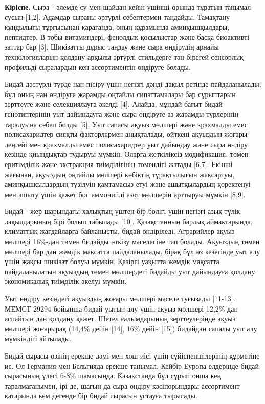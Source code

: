 \begin{multicols}{2}
{\bfseries Кіріспе.} Сыра - әлемде су мен шайдан кейін үшінші орында
тұратын танымал сусын {[}1,2{]}. Адамдар сыраны әртүрлі себептермен
таңдайды. Тамақтану құндылығы тұрғысынан қарағанда, оның құрамында
аминқышқылдары, пептидтер, В тобы витаминдері, фенолдық қосылыстар және
басқа биоактивті заттар бар {[}3{]}. Шикізатты дұрыс таңдау және сыра
өндірудің арнайы технологияларын қолдану арқылы әртүрлі стильдерге тән
бірегей сенсорлық профильді сыралардың кең ассортиментін өндіруге
болады.

Бидай дәстүрлі түрде нан пісіру үшін негізгі дәнді дақыл ретінде
пайдаланылады, бұл оның нан өндіруге жарамды оңтайлы сипаттамалары бар
сұрыптарын зерттеуге және селекциялауға әкелді {[}4{]}. Алайда, мұндай
бағыт бидай генотиптерінің уыт дайындауға және сыра өндіруге аз жарамды
түрлерінің таралуына себеп болды {[}5{]}. Уыт сапасы ақуыз мөлшері және
крахмалды емес полисахаридтер сияқты факторлармен анықталады, өйткені
ақуыздың жоғары деңгейі мен крахмалды емес полисахаридтер уыт дайындау
және сыра өндіру кезінде қиындықтар тудыруы мүмкін. Оларға жеткіліксіз
модификация, төмен еритімділік және экстракция тиімділігінің төмендігі
жатады {[}6,7{]}. Екінші жағынан, ақуыздың оңтайлы мөлшері көбіктің
тұрақтылығын жақсартуы, аминқышқылдардың түзілуін қамтамасыз етуі және
ашытқылардың қоректенуі мен ашыту үшін қажет бос аммонийлі азот мөлшерін
арттыруы мүмкін {[}8,9{]}.

Бидай - жер шарындағы халықтың үштен бір бөлігі үшін негізгі азық-түлік
дақылдарының бірі болып табылады {[}10{]}. Қазақстанның барлық
аймақтарында, климаттық жағдайларға байланысты, бидай өндіріледі.
Аграрийлер ақуыз мөлшері 16\%-дан төмен бидайды өткізу мәселесіне тап
болады. Ақуыздың төмен мөлшері бар дән жемдік мақсатта пайдаланылады,
бірақ бұл өз кезегінде уыт алу үшін жақсы шикізат болуы мүмкін. Қазіргі
уақытта жемдік мақсатта пайдаланылатын ақуыздың төмен мөлшердегі бидайды
уыт дайындауға қолдану экономикалық тиімділік әкелуі мүмкін.

Уыт өндіру кезіндегі ақуыздың жоғары мөлшері мәселе туғызады
{[}11-13{]}. МЕМСТ 29294 бойынша бидай уытын алу үшін ақуыз мөлшері
12,2\%-дан аспайтын дән қолдану қажет. Шетел ғалымдарының зерттеулерінде
ақуыз мөлшері жоғарырақ (14,4\% дейін {[}14{]}, 16\% дейін {[}15{]})
бидайдан сапалы уыт алу мүмкіндігі айтылады.

Бидай сырасы өзінің ерекше дәмі мен хош иісі үшін сүйіспеншілерінің
құрметіне ие. Ол Германия мен Бельгияда ерекше танымал. Кейбір Еуропа
елдерінде бидай сырасының үлесі 6-8\% шамасында. Қазақстанда бұл сұрып
онша кең таралмағанымен, ірі де, шағын да сыра өндіру кәсіпорындары
ассортимент қатарында кем дегенде бір бидай сырасын ұстауға тырысады.


\end{multicols}
